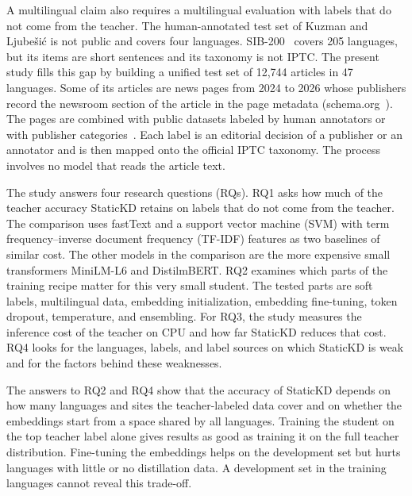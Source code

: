 \documentclass[journal]{IEEEtran}
\begin{document}
A multilingual claim also requires a multilingual evaluation with labels that do not come from the teacher. The human-annotated test set of Kuzman and Ljube\v{s}i\'c is not public and covers four languages. SIB-200~\cite{adelani2024sib200} covers 205 languages, but its items are short sentences and its taxonomy is not IPTC. The present study fills this gap by building a unified test set of 12,744 articles in 47 languages. Some of its articles are news pages from 2024 to 2026 whose publishers record the newsroom section of the article in the page metadata (schema.org~\cite{guha2016schema}). The pages are combined with public datasets labeled by human annotators or with publisher categories~\cite{adelani2023masakhanews,petukhova2023mnds,mirashi2023indicnews,hossain2025banglanews}. Each label is an editorial decision of a publisher or an annotator and is then mapped onto the official IPTC taxonomy. The process involves no model that reads the article text.

The study answers four research questions (RQs). RQ1 asks how much of the teacher accuracy StaticKD retains on labels that do not come from the teacher. The comparison uses fastText and a support vector machine (SVM) with term frequency--inverse document frequency (TF-IDF) features as two baselines of similar cost. The other models in the comparison are the more expensive small transformers MiniLM-L6 and DistilmBERT. RQ2 examines which parts of the training recipe matter for this very small student. The tested parts are soft labels, multilingual data, embedding initialization, embedding fine-tuning, token dropout, temperature, and ensembling. For RQ3, the study measures the inference cost of the teacher on CPU and how far StaticKD reduces that cost. RQ4 looks for the languages, labels, and label sources on which StaticKD is weak and for the factors behind these weaknesses.

The answers to RQ2 and RQ4 show that the accuracy of StaticKD depends on how many languages and sites the teacher-labeled data cover and on whether the embeddings start from a space shared by all languages. Training the student on the top teacher label alone gives results as good as training it on the full teacher distribution. Fine-tuning the embeddings helps on the development set but hurts languages with little or no distillation data. A development set in the training languages cannot reveal this trade-off.
\end{document}
